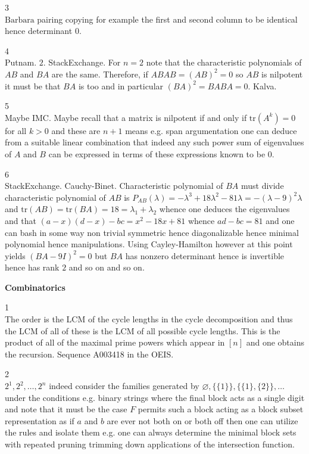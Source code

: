 3 \\
$\boxed{\text{Barbara}}$ pairing copying for example the first and second column to be identical hence determinant $0$.

4 \\
Putnam. $\boxed{2}$. StackExchange. For $n=2$ note that the characteristic polynomials of $AB$ and $BA$ are the same. Therefore, if $ABAB=(AB)^2=0$ so $AB$ is nilpotent it must be that $BA$ is too and in particular $(BA)^2=BABA=0$. Kalva.

5 \\
Maybe IMC. Maybe recall that a matrix is nilpotent if and only if $\text{tr}(A^k)=0$ for all $k>0$ and these are $n+1$ means e.g. span argumentation one can deduce from a suitable linear combination that indeed any such power sum of eigenvalues of $A$ and $B$ can be expressed in terms of these expressions known to be $0$.

6 \\
StackExchange. Cauchy-Binet. Characteristic polynomial of $BA$ must divide characteristic polynomial of $AB$ is $P_{AB}(\lambda)=-\lambda^3+18\lambda^2-81\lambda=-(\lambda-9)^2\lambda$ and $\text{tr}(AB)=\text{tr}(BA)=18=\lambda_1+\lambda_2$ whence one deduces the eigenvalues and that $(a-x)(d-x)-bc=x^2-18x+81$ whence $ad-bc=81$ and one can bash in some way non trivial symmetric hence diagonalizable hence minimal polynomial hence manipulations. Using Cayley-Hamilton however at this point yields $(BA-9I)^2=0$ but $BA$ has nonzero determinant hence is invertible hence has rank $2$ and so on and so on.

\newpage

\textbf{Combinatorics}

1 \\
The order is the LCM of the cycle lengths in the cycle decomposition and thus the LCM of all of these is the LCM of all possible cycle lengths. This is the product of all of the maximal prime powers which appear in $[n]$ and one obtains the recursion. Sequence A003418 in the OEIS.

2 \\
$\boxed{2^1,2^2,\dots,2^n}$ indeed consider the families generated by $\varnothing,\{\{1\}\},\{\{1\},\{2\}\},\dots$ under the conditions e.g. binary strings where the final block acts as a single digit and note that it must be the case $F$ permits such a block acting as a block subset representation as if $a$ and $b$ are ever not both on or both off then one can utilize the rules and isolate them e.g. one can always determine the minimal block sets with repeated pruning trimming down applications of the intersection function.


